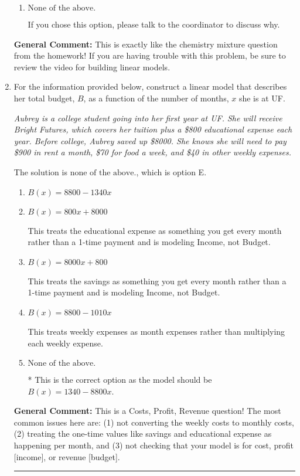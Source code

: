\documentclass{extbook}[14pt]
\newcommand{\litem}[1]{\item #1

\rule{\textwidth}{0.4pt}}
\begin{document}
\begin{enumerate}
{\begin{enumerate}[label=\Alph*.]
This models the cost of the high-quality bean only, not the blended beans.
\item \( \text{None of the above.} \)

If you chose this option, please talk to the coordinator to discuss why.
\end{enumerate}

\textbf{General Comment:} This is exactly like the chemistry mixture question from the homework! If you are having trouble with this problem, be sure to review the video for building linear models.
}
\litem{
For the information provided below, construct a linear model that describes her total budget, $B$, as a function of the number of months, $x$ she is at UF.

\begin{center}
    \textit{ Aubrey is a college student going into her first year at UF. She will receive Bright Futures, which covers her tuition plus a \$800 educational expense each year. Before college, Aubrey saved up \$8000. She knows she will need to pay \$900 in rent a month, \$70 for food a week, and \$40 in other weekly expenses. }
\end{center}
The solution is \( \text{none of the above.} \), which is option E.\begin{enumerate}[label=\Alph*.]
\item \( B(x) = 8800 - 1340 x \)


\item \( B(x) = 800 x + 8000 \)

This treats the educational expense as something you get every month rather than a 1-time payment and is modeling Income, not Budget.
\item \( B(x) = 8000 x + 800 \)

This treats the savings as something you get every month rather than a 1-time payment and is modeling Income, not Budget.
\item \( B(x) = 8800 - 1010 x \)

This treats weekly expenses as month expenses rather than multiplying each weekly expense.
\item \( \text{None of the above.} \)

* This is the correct option as the model should be $B(x) = 1340 - 8800 x$.
\end{enumerate}

\textbf{General Comment:} This is a Costs, Profit, Revenue question! The most common issues here are: (1) not converting the weekly costs to monthly costs, (2) treating the one-time values like savings and educational expense as happening per month, and (3) not checking that your model is for cost, profit [income], or revenue [budget].
}
\end{enumerate}
\end{document}
